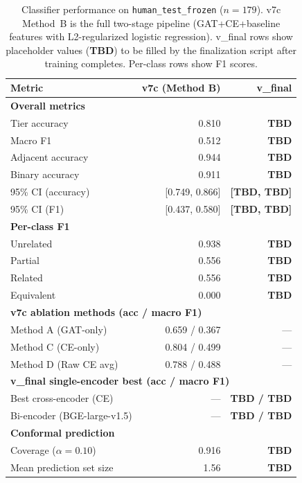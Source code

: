 \begin{table}[t]
\centering
\caption{Classifier performance on \texttt{human\_test\_frozen} ($n=179$).
v7c Method~B is the full two-stage pipeline (GAT+CE+baseline features
with L2-regularized logistic regression).
v\_final rows show placeholder values (\textbf{TBD}) to be filled
by the finalization script after training completes.
Per-class rows show F1 scores.}
\label{tab:main_results}
\begin{tabular}{lrr}
\toprule
Metric & v7c (Method B) & v\_final \\
\midrule
\multicolumn{3}{l}{\textbf{Overall metrics}} \\
Tier accuracy & 0.810 & \textbf{TBD} \\
Macro F1 & 0.512 & \textbf{TBD} \\
Adjacent accuracy & 0.944 & \textbf{TBD} \\
Binary accuracy & 0.911 & \textbf{TBD} \\
95\% CI (accuracy) & [0.749, 0.866] & \textbf{[TBD, TBD]} \\
95\% CI (F1) & [0.437, 0.580] & \textbf{[TBD, TBD]} \\
\midrule
\multicolumn{3}{l}{\textbf{Per-class F1}} \\
Unrelated & 0.938 & \textbf{TBD} \\
Partial & 0.556 & \textbf{TBD} \\
Related & 0.556 & \textbf{TBD} \\
Equivalent & 0.000 & \textbf{TBD} \\
\midrule
\multicolumn{3}{l}{\textbf{v7c ablation methods (acc / macro F1)}} \\
Method A (GAT-only) & 0.659 / 0.367 & --- \\
Method C (CE-only) & 0.804 / 0.499 & --- \\
Method D (Raw CE avg) & 0.788 / 0.488 & --- \\
\midrule
\multicolumn{3}{l}{\textbf{v\_final single-encoder best (acc / macro F1)}} \\
Best cross-encoder (CE) & --- & \textbf{TBD / TBD} \\
Bi-encoder (BGE-large-v1.5) & --- & \textbf{TBD / TBD} \\
\midrule
\multicolumn{3}{l}{\textbf{Conformal prediction}} \\
Coverage ($\alpha{=}0.10$) & 0.916 & \textbf{TBD} \\
Mean prediction set size & 1.56 & \textbf{TBD} \\
\bottomrule
\end{tabular}
\end{table}
